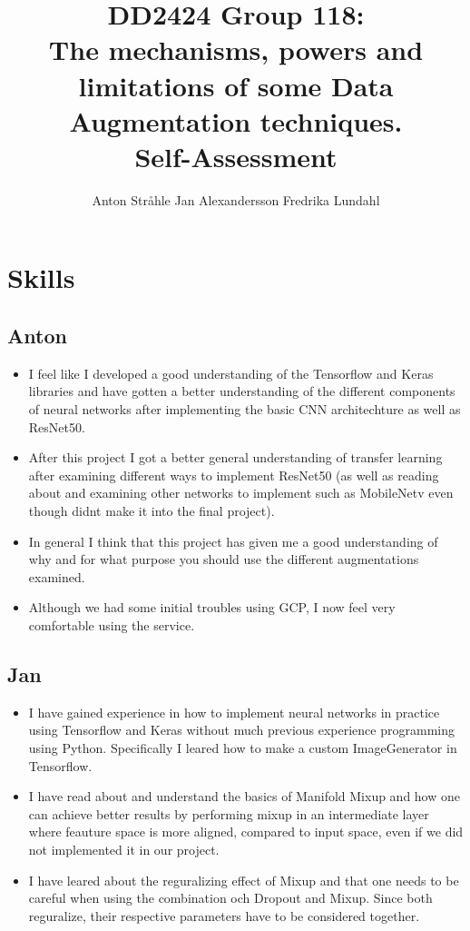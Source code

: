 \documentclass{article}
\title{DD2424 Group 118: \\ The mechanisms, powers and limitations of some Data Augmentation techniques. \\ Self-Assessment}
\author{%
  Anton Stråhle \And Jan Alexandersson \And Fredrika Lundahl}
\begin{document}
	
\maketitle

\section*{Skills}

\subsection*{Anton}

\begin{itemize}
 \item I feel like I developed a good understanding of the Tensorflow and Keras libraries and have gotten a better understanding of the different components of neural networks after implementing the basic CNN architechture as well as ResNet50. 
 \item After this project I got a better general understanding of transfer learning after examining different ways to implement ResNet50 (as well as reading about and examining other networks to implement such as MobileNetv even though didnt make it into the final project). 
 \item In general I think that this project has given me a good understanding of why and for what purpose you should use the different augmentations examined.
 \item Although we had some initial troubles using GCP, I now feel very comfortable using the service.
\end{itemize}


\subsection*{Jan}

\begin{itemize}
  \item I have gained experience in how to implement neural networks in practice using Tensorflow and Keras without much previous experience programming using Python. Specifically I leared how to make a custom ImageGenerator in Tensorflow.

  \item I have read about and understand the basics of Manifold Mixup and how one can achieve better results by performing mixup in an intermediate layer where feauture space is more aligned, compared to input space, even if we did not implemented it in our project.

  \item I have leared about the reguralizing effect of Mixup and that one needs to be careful when using the combination och Dropout and Mixup. Since both reguralize, their respective parameters have to be considered together.
\end{itemize}
\end{document}
